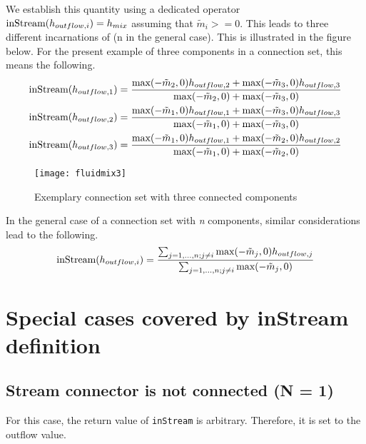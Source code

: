We establish this quantity using a dedicated operator $\text{\lstinline!inStream!}(h_{outflow,i})=h_{mix}$ assuming that $\tilde{m}_{i} >= 0$. This leads to
three different incarnations of (n in the general case). This is
illustrated in the figure below. For the present example of three
components in a connection set, this means the following.
\begin{align*}
\text{\lstinline!inStream!}(h_{outflow,1}) &= \frac{\text{max}(-\tilde{m}_2,0)h_{outflow,2}+\text{max}(-\tilde{m}_3,0)h_{outflow,3}}{\text{max}(-\tilde{m}_2,0)+\text{max}(-\tilde{m}_3,0)}\\
\text{\lstinline!inStream!}(h_{outflow,2}) &= \frac{\text{max}(-\tilde{m}_1,0)h_{outflow,1}+\text{max}(-\tilde{m}_3,0)h_{outflow,3}}{\text{max}(-\tilde{m}_1,0)+\text{max}(-\tilde{m}_3,0)}\\
\text{\lstinline!inStream!}(h_{outflow,3}) &= \frac{\text{max}(-\tilde{m}_1,0)h_{outflow,1}+\text{max}(-\tilde{m}_2,0)h_{outflow,2}}{\text{max}(-\tilde{m}_1,0)+\text{max}(-\tilde{m}_2,0)}
\end{align*}
\begin{figure}[H]
\caption{Exemplary connection set with three connected components}
\begin{center}
\texttt{[image: fluidmix3]}
\end{center}
\end{figure}

In the general case of a connection set with \emph{n} components,
similar considerations lead to the following.
\begin{equation*}
\text{\lstinline!inStream!}(h_{outflow,i})=\frac{\sum_{j=1,...,n;j\neq i}\text{max}(-\tilde{m}_j,0)h_{outflow,j}}{\sum_{j=1,...,n;j\neq i}\text{max}(-\tilde{m}_j,0)}
\end{equation*}

\section{Special cases covered by inStream definition}\label{special-cases-covered-by-the-instream-operator-definition}
\subsection{Stream connector is not connected (N = 1)}\label{stream-connector-is-not-connected-n-1}
For this case, the return value of \lstinline!inStream! is arbitrary.
Therefore, it is set to the outflow value.

